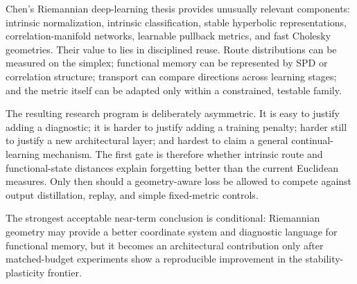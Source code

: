 Chen's Riemannian deep-learning thesis provides unusually relevant components: intrinsic normalization, intrinsic classification, stable hyperbolic representations, correlation-manifold networks, learnable pullback metrics, and fast Cholesky geometries. Their value to \MMALS{} lies in disciplined reuse. Route distributions can be measured on the simplex; functional memory can be represented by SPD or correlation structure; transport can compare directions across learning stages; and the metric itself can be adapted only within a constrained, testable family.

The resulting research program is deliberately asymmetric. It is easy to justify adding a diagnostic; it is harder to justify adding a training penalty; harder still to justify a new architectural layer; and hardest to claim a general continual-learning mechanism. The first gate is therefore whether intrinsic route and functional-state distances explain forgetting better than the current Euclidean measures. Only then should a geometry-aware loss be allowed to compete against output distillation, replay, and simple fixed-metric controls.

\begin{warningbox}
The strongest acceptable near-term conclusion is conditional: Riemannian geometry may provide a better coordinate system and diagnostic language for \MMALS{} functional memory, but it becomes an architectural contribution only after matched-budget experiments show a reproducible improvement in the stability-plasticity frontier.
\end{warningbox}

